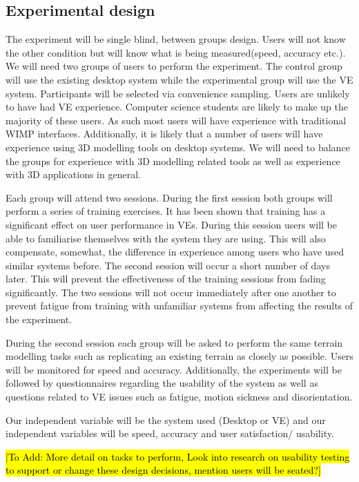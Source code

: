 \documentclass{sig-alternate-05-2015}
\begin{document}
\subsection{Experimental design}
The experiment will be single blind, between groups design. Users will not know the other condition but will know what is being measured(speed, accuracy etc.). We will need two groups of users to perform the experiment. The control group will use the existing desktop system while the experimental group will use the VE system. Participants will be selected via convenience sampling. Users are unlikely to have had VE experience. Computer science students are likely to make up the majority of these users. As such most users will have experience with traditional WIMP interfaces. Additionally, it is likely that a number of users will have experience using 3D modelling tools on desktop systems. We will need to balance the groups for experience with 3D modelling related tools as well as experience with 3D applications in general.

Each group will attend two sessions. During the first session both groups will perform a series of training exercises. It has been shown that training has a significant effect on user performance in VEs\cite{Schultheis2012}. During this session users will be able to familiarise themselves with the system they are using. This will also compensate, somewhat, the difference in experience among users who have used similar systems before. The second session will occur a short number of days later. This will prevent the effectiveness of the training sessions from fading significantly. The two sessions will not occur immediately after one another to prevent fatigue from training with unfamiliar systems from affecting the results of the experiment.

During the second session each group will be asked to perform the same terrain modelling tasks such as replicating an existing terrain as closely as possible. Users will be monitored for speed and accuracy. Additionally, the experiments will be followed by questionnaires regarding the usability of the system as well as questions related to VE issues such as fatigue, motion sickness and disorientation.

Our independent variable will be the system used (Desktop or VE) and our independent variables will be speed, accuracy and user satisfaction/ usability.

\hl{[To Add: More detail on tasks to perform, Look into research on usability testing to support or change these design decisions, mention users will be seated?]}
\end{document}
